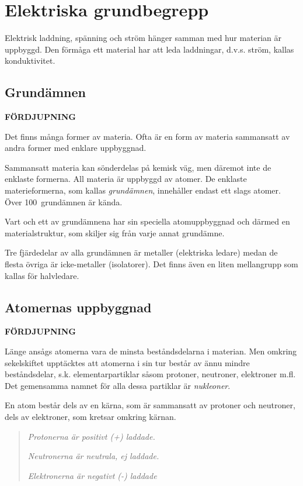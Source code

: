 \section{Elektriska grundbegrepp}


Elektrisk laddning, spänning och ström hänger samman med hur materian är
uppbyggd. Den förmåga ett material har att leda laddningar, d.v.s. ström,
kallas konduktivitet.

\subsection{Grundämnen}
\textbf{FÖRDJUPNING}

Det finns många former av materia. Ofta är en form av materia sammansatt av
andra former med enklare uppbyggnad.

Sammansatt materia kan sönderdelas på kemisk väg, men däremot inte de enklaste
formerna.
All materia är uppbyggd av atomer.
De enklaste materieformerna, som kallas \emph{grundämnen}, innehåller endast
ett slags atomer.
Över 100~grundämnen är kända.

Vart och ett av grundämnena har sin speciella atomuppbyggnad och därmed en
materialstruktur, som skiljer sig från varje annat grundämne.

Tre fjärdedelar av alla grundämnen är metaller (elektriska ledare) medan de
flesta övriga är icke-metaller (isolatorer). Det finns även en liten
mellangrupp som kallas för halvledare.

\subsection{Atomernas uppbyggnad}
\textbf{FÖRDJUPNING}

Länge ansågs atomerna vara de minsta beståndsdelarna i materian. Men omkring
sekelskiftet upptäcktes att atomerna i sin tur består av ännu mindre
beståndsdelar, s.k. elementarpartiklar såsom protoner, neutroner, elektroner
m.fl. Det gemensamma namnet för alla dessa partiklar är \emph{nukleoner}.

En atom består dels av en kärna, som är sammansatt av protoner och neutroner,
dels av elektroner, som kretsar omkring kärnan.

\begin{quote}
\emph{Protonerna är positivt (+) laddade.}

\emph{Neutronerna är neutrala, ej laddade.}

\emph{Elektronerna är negativt (-) laddade}
\end{quote}

